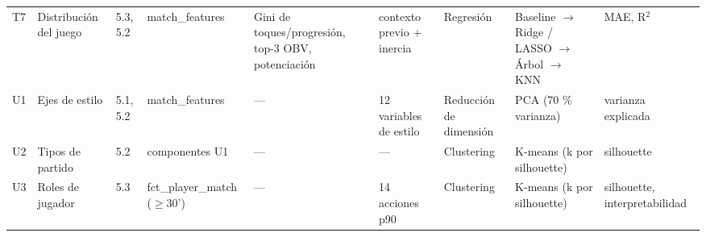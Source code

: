 \begin{table}[H]
{\begin{tabular}{l p{2.1cm} p{0.9cm} p{1.8cm} p{2.1cm} p{3.2cm} p{1.5cm} p{2.6cm} p{1.5cm}}
T7 & Distribución del juego & 5.3, 5.2 & match\_features & Gini de toques/progresión, top-3 OBV, potenciación & contexto previo + inercia & Regresión & Baseline $\rightarrow$ Ridge / LASSO $\rightarrow$ Árbol $\rightarrow$ KNN & MAE, R$^2$ \\
U1 & Ejes de estilo & 5.1, 5.2 & match\_features & — & 12 variables de estilo & Reducción de dimensión & PCA (70 \% varianza) & varianza explicada \\
U2 & Tipos de partido & 5.2 & componentes U1 & — & — & Clustering & K-means (k por silhouette) & silhouette \\
U3 & Roles de jugador & 5.3 & fct\_player\_match ($\geq$30') & — & 14 acciones p90 & Clustering & K-means (k por silhouette) & silhouette, interpretabilidad \\
\bottomrule
\end{tabular}}
\end{table}